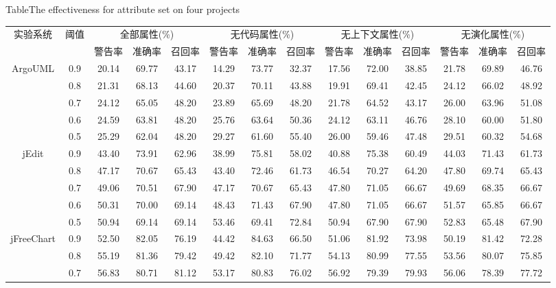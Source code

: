 \begin{sidewaystable} 
{Table$\!$}{The effectiveness for attribute set on four projects}
\vspace{0.5em}
\centering
\wuhao
\begin{tabular}{cccccccccccccc}
\toprule[1.5pt]
\multirow{2}{*}{实验系统}&\multirow{2}{*}{阈值}&\multicolumn{3}{c}{全部属性(\%)}&\multicolumn{3}{c}{无代码属性(\%)}&\multicolumn{3}{c}{无上下文属性(\%)}&\multicolumn{3}{c}{无演化属性(\%)}\\
\cline{3-14}
&&{警告率}&{准确率}&{召回率}&{警告率}&{准确率}&{召回率}&{警告率}&{准确率}&{召回率}&{警告率}&{准确率}&{召回率}\\
\midrule[1pt]
\multirow{5}{*}{ArgoUML}
&0.9&20.14&	69.77&	43.17&14.29&	73.77&	32.37&17.56&	72.00&	38.85&21.78&	69.89&	46.76\\
&0.8&	21.31&	68.13&	44.60&	20.37&	70.11&	43.88&	19.91&	69.41&	42.45&	24.12&	66.02&	48.92\\
&0.7&	24.12&	65.05&	48.20&	23.89&	65.69&	48.20&	21.78&	64.52&	43.17&	26.00&	63.96&	51.08\\
&0.6&	24.59&	63.81&	48.20&	25.76&	63.64&	50.36&	24.12&	63.11&	46.76&	28.10&	60.00&	51.80\\
&0.5&	25.29&	62.04&	48.20&	29.27&	61.60&	55.40&	26.00&	59.46&	47.48&	29.51&	60.32&	54.68\\
\hline
\multirow{5}{*}{jEdit}
&0.9&	43.40&	73.91&	62.96&	38.99&	75.81&	58.02&	40.88&	75.38&	60.49&	44.03&	71.43&	61.73\\
&0.8&	47.17&	70.67&	65.43&	43.40&	72.46&	61.73&	46.54&	70.27&	64.20&	47.80&	69.74&	65.43\\
&0.7&	49.06&	70.51&	67.90&	47.17&	70.67&	65.43&	47.80&	71.05&	66.67&	49.69&	68.35&	66.67\\
&0.6&	50.31&	70.00&	69.14&	48.43&	71.43&	67.90&	47.80&	71.05&	66.67&	51.57&	65.85&	66.67\\
&0.5&	50.94&	69.14&	69.14&	53.46&	69.41&	72.84&	50.94&	67.90&	67.90&	52.83&	65.48&	67.90\\
\hline
\multirow{5}{*}{jFreeChart}
&0.9&	52.50&	82.05&	76.19&	44.42&	84.63&	66.50&	51.06&	81.92&	73.98&	50.19&	81.42&	72.28\\
&0.8&	55.19&	81.36&	79.42&	49.42&	82.10&	71.77&	54.13&	80.99&	77.55&	53.56&	80.07&	75.85\\
&0.7&	56.83&	80.71&	81.12&	53.17&	80.83&	76.02&	56.92&	79.39&	79.93&	56.06&	78.39&	77.72\\

\end{tabular}
\end{sidewaystable}

